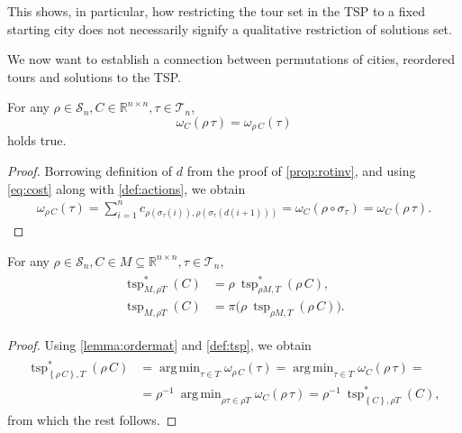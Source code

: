 \documentclass[index=totoc,bibliography=totoc]{scrartcl}
\newcommand{\annotation}[1]{\marginpar{\small\itshape\color{green}#1}}
\DeclareMathOperator*{\argmin}{arg\,min}
\numberwithin{equation}{section}
\numberwithin{figure}{section}
\numberwithin{table}{section}
\begin{document}
This shows, in particular, how restricting the tour set in the TSP to a
fixed starting city does not necessarily signify a qualitative restriction
of solutions set.

We now want to establish a connection between permutations of cities,
reordered tours and solutions to the TSP.

\begin{lemma}
\label{lemma:ordermat}
  For any $\rho \in \mathcal{S}_n, C \in \mathbb{R}^{n \times n}, \tau \in \mathcal{T}_n$,
  \[
    \omega_C\left(\rho\,\tau\right) = \omega_{\rho\,C}\left(\tau\right)
  \]
  holds true.
\end{lemma}
\begin{proof}
  Borrowing definition of $d$ from the proof of \cref{prop:rotinv},
  and using \cref{eq:cost} along with \cref{def:actions}, we obtain
  \begin{align*}
    \omega_{\rho\,C}\left(\tau\right) =
    \sum_{i=1}^n c_{\rho\left(\sigma_\tau\left(i\right)\right),
                    \rho\left(\sigma_\tau\left(d\left(i+1\right)\right)\right)} =
    \omega_C\left(\rho \circ \sigma_\tau\right) =
    \omega_C\left(\rho\,\tau\right).
  \end{align*}
\end{proof}

\begin{corollary}
\label{cor:reorder}
  For any $\rho \in \mathcal{S}_n, C \in M \subseteq \mathbb{R}^{n \times n},
  \tau \in \mathcal{T}_n$,
  \begin{align*}
  \begin{split}
    \operatorname{tsp}^\ast_{M,\rho T}\left(C\right)
    & =
    \rho \: \operatorname{tsp}^\ast_{\rho M,T}\left(\rho\,C\right),
    \\
    \operatorname{tsp}_{M,\rho T}\left(C\right)
    & =
    \pi\big( \rho \: \operatorname{tsp}_{\rho M,T}\left(\rho\,C\right) \big).
  \end{split}
  \end{align*}
\end{corollary}
\begin{proof}
  Using \cref{lemma:ordermat} and \cref{def:tsp}, we obtain
  \begin{align*}
    \begin{split}
    \operatorname{tsp}^\ast_{\left\{\rho\,C\right\},T}\left(\rho\,C\right)
    & =
    \argmin_{\tau \in T} \omega_{\rho\,C}\left(\tau\right) =
    \argmin_{\tau \in T} \omega_{C}\left(\rho\,\tau\right) =
    \\
    & =
    \rho^{-1} \: \argmin_{\rho\tau \in \rho T} \omega_{C}\left(\rho\,\tau\right) =
    \rho^{-1} \: \operatorname{tsp}^\ast_{\left\{C\right\},\rho T}\left(C\right),
    \end{split}
  \end{align*}
  from which the rest follows.
\end{proof}
\end{document}
